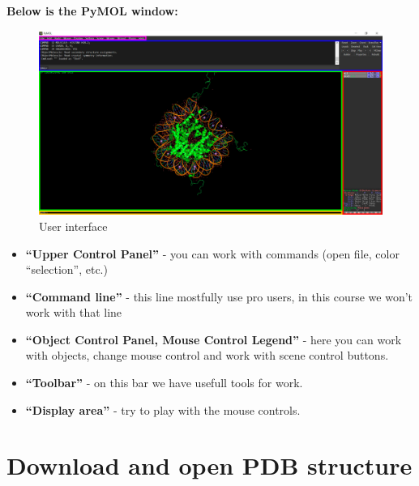 \documentclass{article}
\begin{document}
\textbf{Below is the PyMOL window:}



\begin{figure}[H]
    \centering
    \includegraphics[width=1.0\textwidth]{workshops/pymol/imgs/interfaceimage.png}
    \caption[]{User interface}
    \label{interfaceimg}
\end{figure}

\begin{itemize}
    \item {\color{blue} \textbf{``Upper Control Panel''}} - you can work with commands (open file, color ``selection'', etc.)
    
    \item {\color{orange} \textbf{``Command line''}} - this line mostfully use pro users, in this course we won't work with that line \\
    
    \item  {\color{red} \textbf{``Object Control Panel, Mouse Control Legend''}} - here you can work with objects, change mouse control and work with scene control buttons. \\

    \item {\color{purple} \textbf{``Toolbar''}} - on this bar we have usefull tools for work.

    \item {\color{green} \textbf{``Display area''}} - try to play with the mouse controls.
   
\end{itemize}





\section{Download and open PDB structure}
\end{document}
